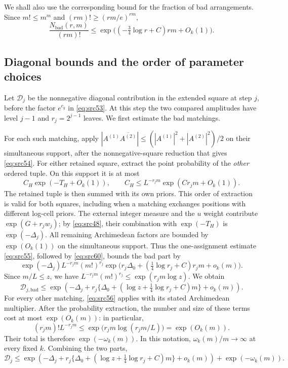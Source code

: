 We shall also use the corresponding bound for the fraction of bad
arrangements.  Since $m!\le m^m$ and $(rm)!\ge(rm/e)^{rm}$,
\begin{equation}\label{eq:conclusion-bad-fraction}
 \frac{N_{\mathrm{bad}}(r,m)}{(rm)!}
 \le\exp\bigl((-\tfrac34\log r+C)rm+O_k(1)\bigr).
\end{equation}

\subsection{Diagonal bounds and the order of parameter choices}

Let $\mathcal D_j$ be the nonnegative diagonal contribution in the
extended square at step $j$, before the factor $e^{c_g}$ in
\eqref{eq:src53}.  At this step the two compared amplitudes have level
$j-1$ and $r_j=2^{j-1}$ leaves.  We first estimate the bad matchings.

For each such matching, apply
$|A^{(1)}\overline{A^{(2)}}|\le
(|A^{(1)}|^2+|A^{(2)}|^2)/2$ on their simultaneous support, after the
nonnegative-square reduction that gives \eqref{eq:src54}.  For either
retained square, extract the point probability of the \emph{other}
ordered tuple.  On this support it is at most
\[
 C_H\exp(-T_H+O_k(1)),
 \qquad
 C_H\le L^{-r_jm}\exp(Cr_jm+O_k(1)).
\]
The retained tuple is then summed with its own priors.  This order of
extraction is valid for both squares, including when a matching exchanges
positions with different log-cell priors.  The external integer measure
and the $u$ weight contribute $\exp(G+r_jw_j)$; by
\eqref{eq:src48}, their combination with $\exp(-T_H)$ is
$\exp(-\Delta_j)$.  All remaining Archimedean factors are bounded by
$\exp(O_k(1))$ on the simultaneous support.  Thus the one-assignment
estimate \eqref{eq:src55}, followed by \eqref{eq:src60}, bounds the bad
part by
\[
 \exp(-\Delta_j) L^{-r_jm}(m!)^{r_j}
 \exp\bigl(r_j\Delta_0+
       (\tfrac14\log r_j+C)r_jm+o_k(m)\bigr).
\]
Since $m/L\le z$, we have
$L^{-r_jm}(m!)^{r_j}\le\exp(r_jm\log z)$.  We obtain
\begin{equation}\label{eq:src61}
 \mathcal D_{j,\mathrm{bad}}
 \le \exp\left(
 -\Delta_j+r_j\bigl\{\Delta_0+
       (\log z+\tfrac14\log r_j+C)m\bigr\}+o_k(m)
 \right).
\end{equation}
For every other matching, \eqref{eq:src56} applies with its stated
Archimedean multiplier.  After the probability extraction, the number
and size of these terms cost at most $\exp(O_k(m))$: in particular,
\[
 (r_jm)!L^{-r_jm}
 \le\exp\bigl(r_jm\log(r_jm/L)\bigr)
 =\exp(O_k(m)).
\]
Their total is therefore $\exp(-\omega_k(m))$.  In this notation,
$\omega_k(m)/m\to\infty$ at every fixed $k$.  Combining the two parts,
\begin{equation}\label{eq:conclusion-diagonal-total}
 \mathcal D_j\le
 \exp\left(
 -\Delta_j+r_j\bigl\{\Delta_0+
       (\log z+\tfrac14\log r_j+C)m\bigr\}+o_k(m)
 \right)+\exp(-\omega_k(m)).
\end{equation}

